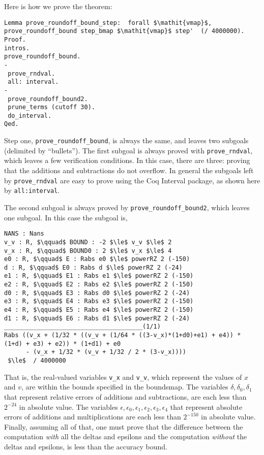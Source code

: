 \documentclass[article]{memoir}
\begin{document}
Here is how we prove the theorem:
\begin{lstlisting}
Lemma prove_roundoff_bound_step:  forall $\mathit{vmap}$, prove_roundoff_bound step_bmap $\mathit{vmap}$ step'  (/ 4000000).
Proof.
intros.
prove_roundoff_bound.
-
 prove_rndval.
 all: interval.
- 
 prove_roundoff_bound2.
 prune_terms (cutoff 30).
 do_interval.
Qed.
\end{lstlisting}
Step one, \lstinline{prove_roundoff_bound}, is always the same,
and leaves two subgoals (delimited by ``bullets'').
The first subgoal is always proved with \lstinline{prove_rndval},
which leaves a few verification conditions.
In this case, there are three: proving that the additions
and subtractions do not overflow.  In general the subgoals
left by \lstinline{prove_rndval} are easy to prove using the Coq
Interval package, as shown here by \lstinline{all:interval}.

The second subgoal is always proved by
\lstinline{prove_roundoff_bound2}, which leaves
one subgoal.  In this case the subgoal is,

\begin{lstlisting}
NANS : Nans
v_v : R, $\qquad$ BOUND : -2 $\le$ v_v $\le$ 2
v_x : R, $\qquad$ BOUND0 : 2 $\le$ v_x $\le$ 4
e0 : R, $\qquad$ E : Rabs e0 $\le$ powerRZ 2 (-150)
d : R, $\qquad$ E0 : Rabs d $\le$ powerRZ 2 (-24)
e1 : R, $\qquad$ E1 : Rabs e1 $\le$ powerRZ 2 (-150)
e2 : R, $\qquad$ E2 : Rabs e2 $\le$ powerRZ 2 (-150)
d0 : R, $\qquad$ E3 : Rabs d0 $\le$ powerRZ 2 (-24)
e3 : R, $\qquad$ E4 : Rabs e3 $\le$ powerRZ 2 (-150)
e4 : R, $\qquad$ E5 : Rabs e4 $\le$ powerRZ 2 (-150)
d1 : R, $\qquad$ E6 : Rabs d1 $\le$ powerRZ 2 (-24)
______________________________________(1/1)
Rabs ((v_x + (1/32 * ((v_v + (1/64 * ((3-v_x)*(1+d0)+e1) + e4)) * (1+d) + e3) + e2)) * (1+d1) + e0
      - (v_x + 1/32 * (v_v + 1/32 / 2 * (3-v_x))))
 $\le$  / 4000000
\end{lstlisting}
\label{stage2proofgoal}
That is, the real-valued variables \lstinline{v_x} and \lstinline{v_v},
which represent the values of $x$ and $v$, are within the bounds
specified in the boundsmap.  The variables 
$\delta,\delta_0,\delta_1$ that represent
relative errors of additions and subtractions, are each less than
$2^{-24}$ in absolute value.  The variables 
$\epsilon,\epsilon_0,\epsilon_1,\epsilon_2,\epsilon_3,\epsilon_4$ that
represent absolute errors of additions and multiplications
are each less than $2^{-150}$ in absolute value.
Finally, assuming all of that, one must prove that the
difference between the computation \emph{with} all the
deltas and epsilons and the computation \emph{without}
the deltas and epsilons, is less than the accuracy bound.
\end{document}
